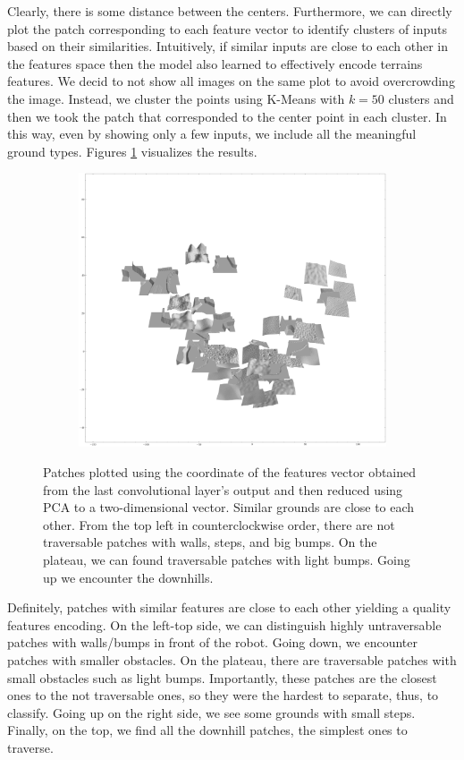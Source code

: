 \documentclass[../document.tex]{subfiles}
\begin{document}
Clearly, there is some distance between the centers. Furthermore, we can directly plot the patch corresponding to each feature vector to identify clusters of inputs based on their similarities. Intuitively, if similar inputs are close to each other in the features space then the model also learned to effectively encode terrains features. We decid to not show all images on the same plot to avoid overcrowding the image. Instead, we cluster the points using K-Means with $k=50$ clusters and then we took the patch that corresponded to the center point in each cluster. In this way, even by showing only a few inputs, we include all the meaningful ground types. Figures \ref{fig : pca-patches-200} visualizes the results.
\begin{figure} [htbp]
    \centering
    \begin{subfigure}[b]{1\textwidth}
        \includegraphics[width=\linewidth]{../img/5/pca/pca-patches-50-None.png}
    \end{subfigure}
    \caption{Patches plotted using the coordinate of the features vector obtained from the last convolutional layer's output and then reduced using PCA to a two-dimensional vector. Similar grounds are close to each other. From the top left in counterclockwise order, there are not traversable patches with walls, steps, and big bumps. On the plateau, we can found traversable patches with light bumps. Going up we encounter the downhills. }
    \label{fig : pca-patches-200}
\end{figure}
Definitely, patches with similar features are close to each other yielding a quality features encoding. On the left-top side, we can distinguish highly untraversable patches with walls/bumps in front of the robot. Going down, we encounter patches with smaller obstacles. On the plateau, there are traversable patches with small obstacles such as light bumps. Importantly,  these patches are the closest ones to the not traversable ones, so they were the hardest to separate, thus, to classify.  Going up on the right side, we see some grounds with small steps. Finally, on the top, we find all the downhill patches, the simplest ones to traverse.
\end{document}
